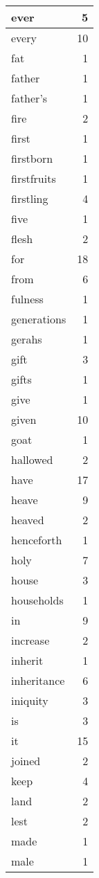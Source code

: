 \begin{center}
\begin{longtable}{l|r}
ever & 5 \\ \hline
every & 10 \\ \hline
fat & 1 \\ \hline
father & 1 \\ \hline
father's & 1 \\ \hline
fire & 2 \\ \hline
first & 1 \\ \hline
firstborn & 1 \\ \hline
firstfruits & 1 \\ \hline
firstling & 4 \\ \hline
five & 1 \\ \hline
flesh & 2 \\ \hline
for & 18 \\ \hline
from & 6 \\ \hline
fulness & 1 \\ \hline
generations & 1 \\ \hline
gerahs & 1 \\ \hline
gift & 3 \\ \hline
gifts & 1 \\ \hline
give & 1 \\ \hline
given & 10 \\ \hline
goat & 1 \\ \hline
hallowed & 2 \\ \hline
have & 17 \\ \hline
heave & 9 \\ \hline
heaved & 2 \\ \hline
henceforth & 1 \\ \hline
holy & 7 \\ \hline
house & 3 \\ \hline
households & 1 \\ \hline
in & 9 \\ \hline
increase & 2 \\ \hline
inherit & 1 \\ \hline
inheritance & 6 \\ \hline
iniquity & 3 \\ \hline
is & 3 \\ \hline
it & 15 \\ \hline
joined & 2 \\ \hline
keep & 4 \\ \hline
land & 2 \\ \hline
lest & 2 \\ \hline
made & 1 \\ \hline
male & 1 \\ \hline

\end{longtable}
\end{center}
